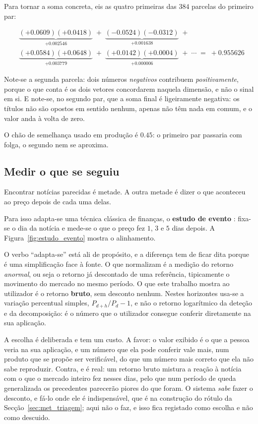 Para tornar a soma concreta, eis as quatro primeiras das $384$ parcelas do primeiro par:

\begin{equation*}
\begin{aligned}
  &\underbrace{(+0.0609)(+0.0418)}_{+0.002546} \;+\;
   \underbrace{(-0.0524)(-0.0312)}_{+0.001638} \;+\; \\[4pt]
  &\underbrace{(+0.0584)(+0.0648)}_{+0.003779} \;+\;
   \underbrace{(+0.0142)(+0.0004)}_{+0.000006} \;+\; \cdots \;=\; +0.955626
\end{aligned}
\end{equation*}

Note-se a segunda parcela: dois números \emph{negativos} contribuem \emph{positivamente}, porque o
que conta é os dois vetores concordarem naquela dimensão, e não o sinal em si. E note-se, no segundo par,
que a soma final é ligeiramente negativa: os títulos não são opostos em sentido nenhum, apenas não
têm nada em comum, e o valor anda à volta de zero.

O chão de semelhança usado em produção é $0.45$: o primeiro par passaria com folga, o segundo nem se aproxima.

\subsection{Medir o que se seguiu}

Encontrar notícias parecidas é metade. A outra metade é dizer o que aconteceu ao preço depois de cada
uma delas.

Para isso adapta-se uma técnica clássica de finanças, o \textbf{estudo de evento}
\autocite{brown1985daily}: fixa-se o dia da notícia e mede-se o que o preço fez $1$, $3$ e $5$ dias
depois. A Figura~\ref{fig:estudo_evento} mostra o alinhamento.

O verbo ``adapta-se'' está ali de propósito, e a diferença tem de ficar dita porque é uma
simplificação face à fonte. O que \textcite{brown1985daily} normalizam é a medição do retorno
\emph{anormal}, ou seja o retorno já descontado de uma referência, tipicamente o movimento do
mercado no mesmo período. O que este trabalho mostra ao utilizador é o retorno \textbf{bruto},
sem desconto nenhum. Nestes horizontes usa-se a variação percentual simples,
$P_{d+h}/P_d-1$, e não o retorno logarítmico da deteção e da decomposição: é o número que o
utilizador consegue conferir diretamente na sua aplicação.

A escolha é deliberada e tem um custo. A favor: o valor exibido é o que a pessoa veria na sua
aplicação, e um número que ela pode conferir vale mais, num produto que se propõe ser verificável,
do que um número mais correto que ela não sabe reproduzir. Contra, e é real: um retorno bruto mistura
a reação à notícia com o que o mercado inteiro fez nesses dias, pelo que num período de queda
generalizada os precedentes parecerão piores do que foram. O sistema \emph{sabe} fazer o desconto,
e fá-lo onde ele é indispensável, que é na construção do rótulo da Secção~\ref{sec:met_triagem};
aqui não o faz, e isso fica registado como escolha e não como descuido.


